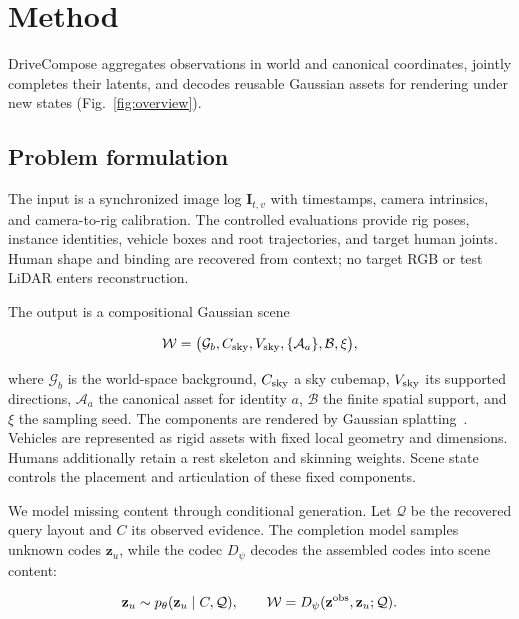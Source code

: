 \section{Method}\label{sec:method}

DriveCompose aggregates observations in world and canonical coordinates, jointly completes their latents, and decodes reusable Gaussian assets for rendering under new states (Fig.~\ref{fig:overview}).



\subsection{Problem formulation}
\label{sec:representation}

The input is a synchronized image log $\mathbf I_{t,v}$ with timestamps, camera intrinsics, and camera-to-rig calibration. The controlled evaluations provide rig poses, instance identities, vehicle boxes and root trajectories, and target human joints. Human shape and binding are recovered from context; no target RGB or test LiDAR enters reconstruction.

The output is a compositional Gaussian scene

\begin{equation}
\mathcal W=\bigl(\mathcal G_b,C_{\rm sky},V_{\rm sky},
\{\mathcal A_a\},\mathcal B,\xi\bigr),
\label{eq:world}
\end{equation}

where $\mathcal G_b$ is the world-space background, $C_{\rm sky}$ a sky cubemap, $V_{\rm sky}$ its supported directions, $\mathcal A_a$ the canonical asset for identity $a$, $\mathcal B$ the finite spatial support, and $\xi$ the sampling seed. The components are rendered by Gaussian splatting~\cite{kerbl2023gaussians}. Vehicles are represented as rigid assets with fixed local geometry and dimensions. Humans additionally retain a rest skeleton and skinning weights. Scene state controls the placement and articulation of these fixed components.

We model missing content through conditional generation. Let $\mathcal Q$ be the recovered query layout and $C$ its observed evidence. The completion model samples unknown codes $\mathbf z_u$, while the codec $D_\psi$ decodes the assembled codes into scene content:

\begin{equation}
\mathbf z_u\sim p_\theta(\mathbf z_u\mid C,\mathcal Q),
\qquad
\mathcal W=D_\psi(\mathbf z^{\rm obs},\mathbf z_u;\mathcal Q).
\label{eq:generative-reconstruction}
\end{equation}

